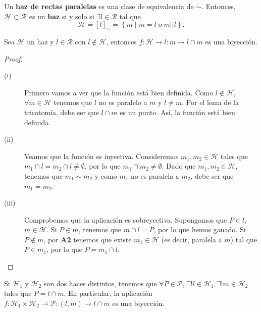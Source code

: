 \begin{definition}
Un \textbf{haz de rectas paralelas} es una clase de equivalencia de $\displaystyle \sim $. Entonces, $\displaystyle \mathcal{H} \subset \mathcal{R}  $ es un \textbf{haz} si y solo si $\displaystyle \exists l \in \mathcal{R} $ tal que 
\[\mathcal{H} = [l]_{\sim} = \left\{ m \; | \; m = l \; \text{o} \; m | | l\right\}  .\]
\end{definition}
\begin{prop}
Sea $\displaystyle \mathcal{H} $ un haz y $\displaystyle l \in \mathcal{R} $ con $\displaystyle l \not\in \mathcal{H} $, entonces $\displaystyle f: \mathcal{H} \to l : m \to l \cap m $ es una biyección.
\end{prop}
\begin{proof}
\begin{description}
\item[(i)] Primero vamos a ver que la función está bien definida. Como $\displaystyle l \not\in \mathcal{H} $, $\displaystyle \forall m \in \mathcal{H} $ tenemos que $\displaystyle l  $ no es paralelo a $\displaystyle m $ y $\displaystyle l \neq m $. Por el lema de la tricotomía, debe ser que $\displaystyle l \cap m $ es un punto. Así, la función está bien definida.
\item[(ii)] Veamos que la función es inyectiva. Consideremos $\displaystyle m_{1}, m_{2} \in \mathcal{H} $ tales que $\displaystyle m_{1} \cap l = m_{2} \cap l \neq \emptyset $, por lo que $\displaystyle m_{1} \cap m_{2} \neq \emptyset $. Dado que $\displaystyle m_{1}, m_{2} \in \mathcal{H} $, tenemos que $\displaystyle m_{1} \sim m_{2} $ y como $\displaystyle m_{1} $ no es paralela a $\displaystyle m_{2} $, debe ser que $\displaystyle m_{1} = m_{2}$.
\item[(iii)] Comprobemos que la aplicación es sobreyectiva. Supongamos que $\displaystyle P \in l $, $\displaystyle  m \in \mathcal{H} $. Si $\displaystyle P \in m $, tenemos que $\displaystyle m \cap l = P $, por lo que hemos ganado. Si $\displaystyle  P \not\in m $, por \textbf{A2} tenemos que existe $\displaystyle m_{1} \in \mathcal{H} $ (es decir, paralela a $\displaystyle m $) tal que $\displaystyle P \in m_{1} $, por lo que $\displaystyle P = m_{1} \cap l $.
\end{description}
\end{proof}
\begin{prop}
Si $\displaystyle \mathcal{H}_{1} $ y $\displaystyle \mathcal{H}_{2} $ son dos haces distintos, tenemos que $\displaystyle \forall P \in \mathcal{P} $, $\displaystyle \exists! l \in \mathcal{H}_{1}, \exists! m \in \mathcal{H}_{2} $ tales que  $\displaystyle P = l \cap m $. En particular, la aplicación $\displaystyle f: \mathcal{H}_{1} \times \mathcal{H}_{2} \to \mathcal{P} : \left(l, m\right) \to l \cap m$ es una biyección.
\end{prop}
